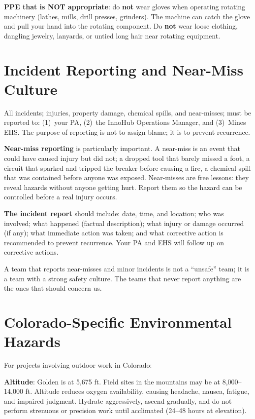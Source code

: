 \textbf{PPE that is NOT appropriate}: do \textbf{not} wear gloves when operating rotating machinery (lathes, mills, drill presses, grinders). The machine can catch the glove and pull your hand into the rotating component. Do \textbf{not} wear loose clothing, dangling jewelry, lanyards, or untied long hair near rotating equipment.

\section{Incident Reporting and Near-Miss Culture}
All incidents; injuries, property damage, chemical spills, and near-misses; must be reported to: (1)~your PA, (2)~the InnoHub Operations Manager, and (3)~Mines EHS. The purpose of reporting is not to assign blame; it is to prevent recurrence.

\textbf{Near-miss reporting} is particularly important. A near-miss is an event that could have caused injury but did not; a dropped tool that barely missed a foot, a circuit that sparked and tripped the breaker before causing a fire, a chemical spill that was contained before anyone was exposed. Near-misses are free lessons: they reveal hazards without anyone getting hurt. Report them so the hazard can be controlled before a real injury occurs.

\textbf{The incident report} should include: date, time, and location; who was involved; what happened (factual description); what injury or damage occurred (if any); what immediate action was taken; and what corrective action is recommended to prevent recurrence. Your PA and EHS will follow up on corrective actions.

A team that reports near-misses and minor incidents is not a ``unsafe'' team; it is a team with a strong safety culture. The teams that never report anything are the ones that should concern us.

\section{Colorado-Specific Environmental Hazards}
For projects involving outdoor work in Colorado:

\textbf{Altitude}: Golden is at 5,675 ft. Field sites in the mountains may be at 8,000--14,000 ft. Altitude reduces oxygen availability, causing headache, nausea, fatigue, and impaired judgment. Hydrate aggressively, ascend gradually, and do not perform strenuous or precision work until acclimated (24--48 hours at elevation).

